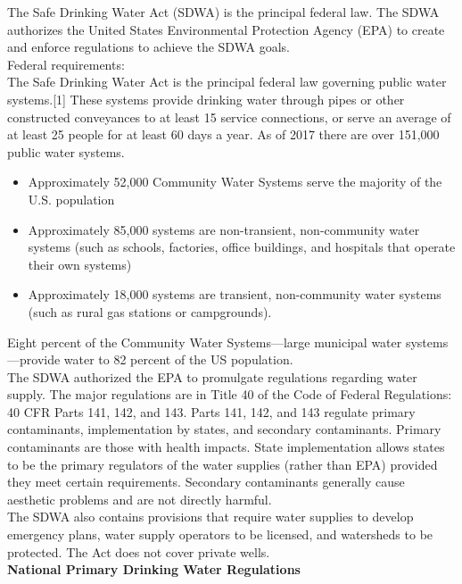 \documentclass{article}
\begin{document}
The Safe Drinking Water Act (SDWA) is the principal federal law. The SDWA authorizes the United States Environmental Protection Agency (EPA) to create and enforce regulations to achieve the SDWA goals.\\

Federal requirements:\\
The Safe Drinking Water Act is the principal federal law governing public water systems.[1] These systems provide drinking water through pipes or other constructed conveyances to at least 15 service connections, or serve an average of at least 25 people for at least 60 days a year. As of 2017 there are over 151,000 public water systems.\\
\begin{itemize}
\item Approximately 52,000 Community Water Systems serve the majority of the U.S. population
\item Approximately 85,000 systems are non-transient, non-community water systems (such as schools, factories, office buildings, and hospitals that operate their own systems)
\item Approximately 18,000 systems are transient, non-community water systems (such as rural gas stations or campgrounds).
\end{itemize}
Eight percent of the Community Water Systems—large municipal water systems—provide water to 82 percent of the US population.\\
The SDWA authorized the EPA to promulgate regulations regarding water supply. The major regulations are in Title 40 of the Code of Federal Regulations: 40 CFR Parts 141, 142, and 143. Parts 141, 142, and 143 regulate primary contaminants, implementation by states, and secondary contaminants. Primary contaminants are those with health impacts. State implementation allows states to be the primary regulators of the water supplies (rather than EPA) provided they meet certain requirements. Secondary contaminants generally cause aesthetic problems and are not directly harmful.\\
The SDWA also contains provisions that require water supplies to develop emergency plans, water supply operators to be licensed, and watersheds to be protected. The Act does not cover private wells.\\
\textbf{National Primary Drinking Water Regulations}\\
\end{document}
